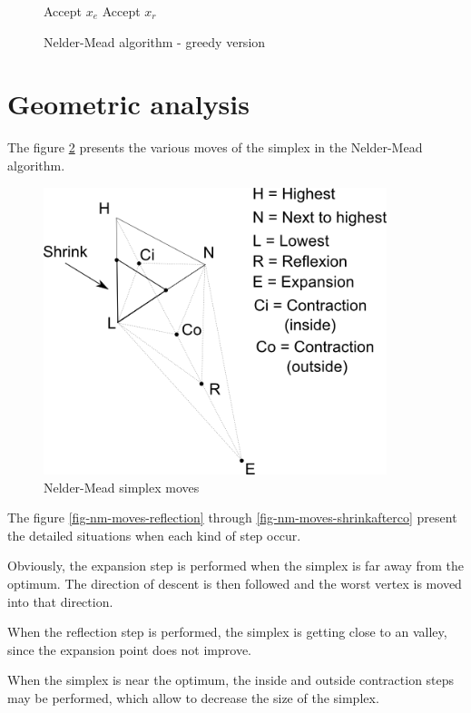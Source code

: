 \begin{figure}[htbp]
\begin{algorithmic}
      \STATE Accept $x_e$
    \ELSE
      \STATE Accept $x_r$
    \ENDIF
\end{algorithmic}
\caption{Nelder-Mead algorithm - greedy version}
\label{algo-neldermead-greedy}
\end{figure}


\section{Geometric analysis}

The figure \ref{fig-nm-moves} presents the various moves of the 
simplex in the Nelder-Mead algorithm.

\begin{figure}
\begin{center}
\includegraphics[width=10cm]{nelder-mead-steps.png}
\end{center}
\caption{Nelder-Mead simplex moves}
\label{fig-nm-moves}
\end{figure}

The figure \ref{fig-nm-moves-reflection} 
through \ref{fig-nm-moves-shrinkafterco} present the 
detailed situations when each kind of step occur.
 
Obviously, the expansion step is performed when the 
simplex is far away from the optimum. The direction of 
descent is then followed and the worst vertex is moved 
into that direction.

When the reflection step is performed, the simplex is 
getting close to an valley, since the expansion point 
does not improve.

When the simplex is near the optimum, 
the inside and outside contraction steps may be performed, which 
allow to decrease the size of the simplex.

